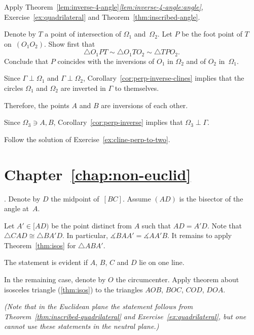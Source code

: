 Apply Theorem~\ref{lem:inverse-4-angle}\textit{\ref{lem:inverse-4-angle:angle}},  
Exercise~\ref{ex:quadrilateral}
and Theorem~\ref{thm:inscribed-angle}.

Denote by $T$ 
a point of intersection of $\Omega_1$ and~$\Omega_2$.
Let $P$ be the foot point of $T$ on~$(O_1O_2)$.
Show first that
$$\triangle O_1PT
\sim \triangle O_1TO_2
\sim \triangle TPO_2.$$
Conclude that $P$ coincides with the inversions of $O_1$ in $\Omega_2$ and of $O_2$ in~$\Omega_1$.

Since $\Gamma\perp\Omega_1$ and $\Gamma\perp\Omega_2$,
Corollary~\ref{cor:perp-inverse-clines} 
implies that
the circles $\Omega_1$ and $\Omega_2$ are inverted in $\Gamma$ 
to themselves.

Therefore, the points $A$ and $B$ are inversions of each other.

Since $\Omega_3\ni A,B$,
Corollary~\ref{cor:perp-inverse} implies that
$\Omega_3\perp \Gamma$.

Follow the solution of Exercise~\ref{ex:cline-perp-to-two}.

\section*{Chapter~\ref{chap:non-euclid}}
\setcounter{eqtn}{0}

.
Denote by $D$ the midpoint of~$[BC]$.
Assume $(AD)$ is the bisector of the angle at~$A$.

Let $A'\in [AD)$ be the point distinct from $A$ such that $AD=A'D$.
Note that $\triangle CAD\cong\triangle BA'D$.
In particular, $\measuredangle BAA'=\measuredangle AA'B$.
It remains to apply Theorem~\ref{thm:isos} for $\triangle ABA'$.

The statement is evident if $A$, $B$, $C$ and $D$ lie on one line.

In the remaining case, denote by $O$ the circumcenter.
Apply theorem about isosceles triangle (\ref{thm:isos}) to the triangles 
$AOB$,
$BOC$, 
$COD$, 
$DOA$. 

\textit{(Note that in the Euclidean plane the statement follows from Theorem~\ref{thm:inscribed-quadrilateral} and Exercise~\ref{ex:quadrilateral},
but one cannot use these statements in the neutral plane.)}

